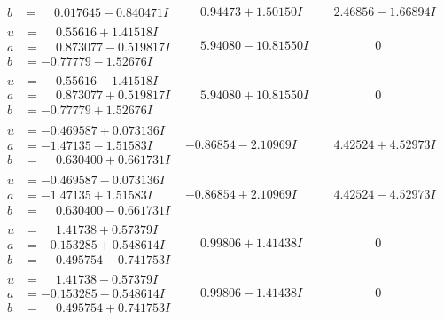 \documentclass[1p]{elsarticle_modified}
\theoremstyle{definition}
\begin{document}
$$\begin{array}{c|c|c}
\begin{aligned}
b &= \phantom{-}0.017645 - 0.840471 I\end{aligned}
 & \phantom{-}0.94473 + 1.50150 I & \phantom{-}2.46856 - 1.66894 I \\ \hline\begin{aligned}
u &= \phantom{-}0.55616 + 1.41518 I \\
a &= \phantom{-}0.873077 - 0.519817 I \\
b &= -0.77779 - 1.52676 I\end{aligned}
 & \phantom{-}5.94080 - 10.81550 I & \phantom{-0.000000 } 0 \\ \hline\begin{aligned}
u &= \phantom{-}0.55616 - 1.41518 I \\
a &= \phantom{-}0.873077 + 0.519817 I \\
b &= -0.77779 + 1.52676 I\end{aligned}
 & \phantom{-}5.94080 + 10.81550 I & \phantom{-0.000000 } 0 \\ \hline\begin{aligned}
u &= -0.469587 + 0.073136 I \\
a &= -1.47135 - 1.51583 I \\
b &= \phantom{-}0.630400 + 0.661731 I\end{aligned}
 & -0.86854 - 2.10969 I & \phantom{-}4.42524 + 4.52973 I \\ \hline\begin{aligned}
u &= -0.469587 - 0.073136 I \\
a &= -1.47135 + 1.51583 I \\
b &= \phantom{-}0.630400 - 0.661731 I\end{aligned}
 & -0.86854 + 2.10969 I & \phantom{-}4.42524 - 4.52973 I \\ \hline\begin{aligned}
u &= \phantom{-}1.41738 + 0.57379 I \\
a &= -0.153285 + 0.548614 I \\
b &= \phantom{-}0.495754 - 0.741753 I\end{aligned}
 & \phantom{-}0.99806 + 1.41438 I & \phantom{-0.000000 } 0 \\ \hline\begin{aligned}
u &= \phantom{-}1.41738 - 0.57379 I \\
a &= -0.153285 - 0.548614 I \\
b &= \phantom{-}0.495754 + 0.741753 I\end{aligned}
 & \phantom{-}0.99806 - 1.41438 I & \phantom{-0.000000 } 0\\

\end{array}$$
\end{document}
